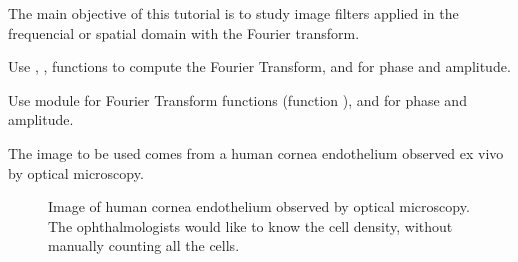 \def\difficulty{1}

\begin{note}The main objective of this tutorial is to study image filters applied in the frequencial or spatial domain with the Fourier transform. \end{note}

\begin{mcomment}
\begin{mremark}
Use  , ,  functions to compute the Fourier Transform,  and  for phase and amplitude.
\end{mremark}
\end{mcomment}
\begin{pcomment}
\begin{premark}
Use module   for Fourier Transform functions (function ),  and  for phase and amplitude.
\end{premark}
\end{pcomment}

\noindent The image to be used comes from a human cornea endothelium observed ex vivo by optical microscopy. 

\begin{figure}[htbp]
\centering\caption{Image of human cornea endothelium observed by optical microscopy. The ophthalmologists would like to know the cell density, without manually counting all the cells.}%
\hfill
{}%
\label{fig:cornea}
\end{figure}

